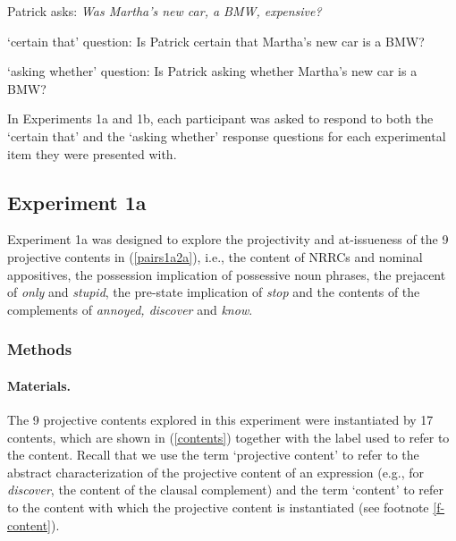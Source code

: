 \documentclass[11pt,fleqn]{article}
\newcommand{\6}{\mbox{$[\hspace*{-.6mm}[$}}
\newcommand{\9}{\mbox{$]\hspace*{-.6mm}]$}}
\begin{document}
\begin{exe}

\ex\label{stim} Patrick asks: {\em Was Martha's new car, a BMW, expensive?} 

\begin{xlist}
\ex `certain that' question: Is Patrick certain that Martha's new car is a BMW?

\ex `asking whether' question: Is Patrick asking whether Martha's new car is a BMW?

\end{xlist}

\end{exe}
In Experiments 1a and 1b, each participant was asked to respond to both the `certain that'  and the `asking whether' response questions for each experimental item they were presented with.

\subsection{Experiment 1a}\label{s-exp1a}

Experiment 1a was designed to explore the projectivity and at-issueness of the 9 projective contents in (\ref{pairs1a2a}), i.e., the content of NRRCs and nominal appositives, the possession implication of possessive noun phrases, the prejacent of {\em only} and {\em stupid}, the pre-state implication of {\em stop} and the contents of the complements of {\em annoyed, discover} and {\em know}.

\subsubsection{Methods}\label{s-methods-1a}

\paragraph{Materials.} The 9 projective contents explored in this experiment were instantiated by 17 contents, which are shown in (\ref{contents}) together with the label used to refer to the content. Recall that we use the term `projective content' to refer to the abstract characterization of the projective content of an expression (e.g., for {\em discover}, the content of the clausal complement) and the term `content' to refer to the content with which the projective content is instantiated (see footnote \ref{f-content}).
\end{document}

